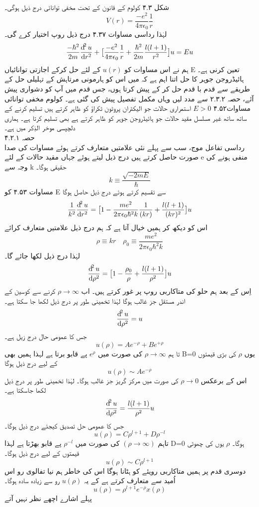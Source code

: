\documentclass{book}
\begin{document}
 شکل ۴.۳
 کولوم کے قانون کے تحت مخفی توانائی درج ذیل ہوگی۔  
 \[V(r)=\frac{-e^{2}}{4\pi\epsilon_{0}}\frac{1}{r}\]
لہٰذا رداسی مساوات ۴.۳۷ درج ذیل روپ اختیار کرے گی۔
\[\frac{-\hbar^{2}}{2m}\frac{\dif^{2}{u}}{\dif{r^{2}}}+\big[\frac{-e^{2}}{4\pi\epsilon_{0}}\frac{1}{r}+\frac{\hbar^{2}}{2m}\frac{l(l+1)}{r^{2}}\big]u=Eu\]
 ہم نے اس مساوات کو 
 \(u(r)\)
  کے لئے حل کرکے اجازتی توانائیاں E تعین کرنی ہے۔  ہائیڈروجن جوہر کا حل اتنا اہم ہے کہ میں اس کو ہارمونی مرتاہش کے تہلیلی حل کے طریقے سے قدم با قدم حل کر کے پیش کرتا ہوں، جس قدم میں آپ کو دشواری پیش آئے، حصہ ۲.۳.۲ سے مدد لیں وہاں مکمل تفصیل پیش کی گئی ہے۔ کولوم مخفی توانائی مساوات۴.۵۲ 
 \(E>0\)
 استمراری حالات جو الیکٹران پروٹون ٹکراؤ کو ظاہر کرتے ہیں تسلیم کرنے کے ساتھ ساتھ غیر مسلسل مقید حالات جو ہائیڈروجن جوہر کو ظاہر کرتے ہے بھی تسلیم کرتا ہے۔ ہماری دلچپسی موخر الذِکر میں ہے۔ \\
 حصہ ۴.۲.۱ \\
 رداسی تفاعل موج، سب سے پہلے نئی علامتیں متعارف کرتے ہوئے مساوات کی صدا صورت حاصل کرتے ہیں درج ذیل لیتے ہوئے جہاں مقید حالات کے لئے e منفی ہونے کی وجہ سے k  حقیقی ہوگا۔ \\
 \[k\equiv \frac{\sqrt{-2mE}}{\hbar}\]
 مساوات ۴.۵۳ کو E سے تقسیم کرتے ہوئے درج ذیل حاصل ہوگا \\
\[\frac{1}{k^{2}}\frac{\dif^{2}{u}}{\dif{r^{2}}}=\big[1-\frac{me^{2}}{2\pi\epsilon_{0}\hbar^{2}k}\frac{1}{(kr)}+\frac{l(l+1)}{(kr)^{2}}\big]u\]
اس کو دیکھ کر ہمیں خیال آتا ہے کہ ہم درج ذیل علامتیں متعارف کرائے 
\[\rho\equiv kr \quad \rho_{0}\equiv\frac{me^{2}}{2\pi\epsilon_{0}\hbar^{2}k}\]
لہٰذا درج ذیل لکھا جائے گا۔
\[\frac{\dif^{2}{u}}{\dif{\rho^{2}}}=\big[1-\frac{\rho_{0}}{\rho}+\frac{l(l+1)}{\rho^{2}}\big]u\]
اِس کے بعد ہم حلو کی متاکاربی روپ پر غور کرتے ہیں۔ اب
\(\rho\rightarrow\infty\)
کرنے سے کوسین کے اندر مستقل جز غالب ہوگا لہٰذا تخمینی طور پر درج ذیل لکھا جا سکتا ہے۔
\[\frac{\dif^{2}{u}}{\dif{\rho^{2}}}=u\]
جس کا عمومی حال درج زیل ہے۔
\[u(\rho)=Ae^{-\rho}+Be^{+\rho}\]
تا ہم 
\(\rho\rightarrow\infty\)
کی صورت میں 
\(e^{\rho}\)
پے قابو برتا ہے لہذا ہمیں بھی
B=0
یوں 
\(\rho\)
کی بڑی قیمتوں کے لیے درج  ذیل ہوگا 
\[u(\rho)\sim Ae^{-\rho}\]
اس کے برعکس 
\(\rho\rightarrow 0\)
کی صورت میں مرکز گریز جز غالب ہوگا۔ لہٰذا تخمينی طور پر درج ذیل لکھا جاسکتا ہے۔ 
\[\frac{\dif^{2}{u}}{\dif{\rho^{2}}}=\frac{l(l+1)}{\rho^{2}}u\]
 جس کا عمومی حل تصدیق کیجئے درج ذیل ہوگا۔
 \[u(\rho)=C\rho^{l+1}+D\rho^{-l}\]
 تاہم
 \((\rho\rightarrow\infty)\)
 کی صورت میں
 \(\rho^{-l}\)
 پے قابو بھڑتا ہے لہذا
 D=0
 ہوگا۔
 \(\rho\)
 یوں 
 کی چھوٹی قیمتوں کے لیے درج ذیل ہوگا۔
 \[u(\rho)\sim C\rho^{l+1}\]
  دوسری قدم پر ہمیں متاکاربی رویئے کو ہٹانا ہوگا اس کی خاطر ہم نیا تفالوی رو اس اُمید سے متعارف کرتے ہے کے یہ
   \(u(\rho)\)
    رو سے زیادہ سادہ ہوگا۔
  \[u(\rho)=\rho^{l+1}e^{-\rho}x(\rho)\]
  پہلے اشارے اچھے نظر نہیں آتے
\end{document}
